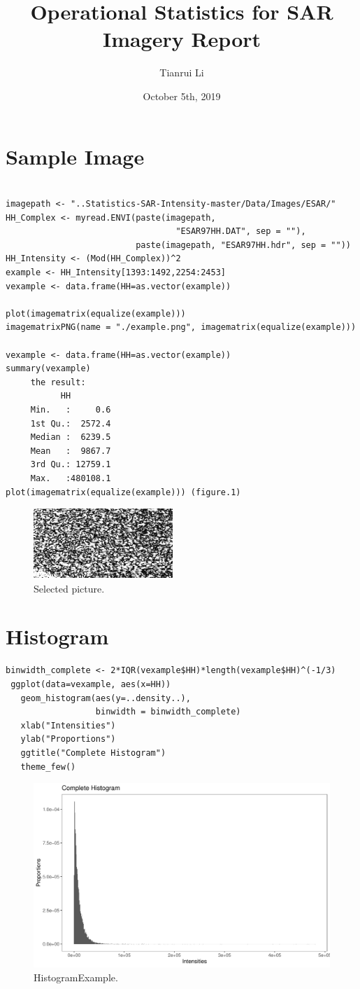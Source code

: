 \documentclass{article}
\title{Operational Statistics for SAR Imagery Report}
\author{Tianrui Li}
\date{October 5th, 2019}
\begin{document}
\maketitle
\section{Sample Image}
\begin{lstlisting}[frame=tb]

imagepath <- "..Statistics-SAR-Intensity-master/Data/Images/ESAR/"
HH_Complex <- myread.ENVI(paste(imagepath,
                                  "ESAR97HH.DAT", sep = ""), 
                          paste(imagepath, "ESAR97HH.hdr", sep = ""))
HH_Intensity <- (Mod(HH_Complex))^2
example <- HH_Intensity[1393:1492,2254:2453]
vexample <- data.frame(HH=as.vector(example))

plot(imagematrix(equalize(example)))
imagematrixPNG(name = "./example.png", imagematrix(equalize(example)))

vexample <- data.frame(HH=as.vector(example))
summary(vexample)
	 the result:
	       HH          
	 Min.   :     0.6  
	 1st Qu.:  2572.4  
	 Median :  6239.5  
	 Mean   :  9867.7  
	 3rd Qu.: 12759.1  
	 Max.   :480108.1  
plot(imagematrix(equalize(example))) (figure.1)
\end{lstlisting}

\begin{figure}[htb]
\centering	
\includegraphics[width=0.5\linewidth]{example.png}
\caption{Selected picture.}
\label{fig:example}
\end{figure}






\section{Histogram}
\begin{lstlisting}[frame=tb]
 binwidth_complete <- 2*IQR(vexample$HH)*length(vexample$HH)^(-1/3)
 ggplot(data=vexample, aes(x=HH)) 
   geom_histogram(aes(y=..density..), 
                  binwidth = binwidth_complete)  
   xlab("Intensities") 
   ylab("Proportions") 
   ggtitle("Complete Histogram") 
   theme_few()
\end{lstlisting}
\begin{figure}
	\centering
	\includegraphics[width=0.5\linewidth]{HistogramExample.pdf}
	\caption{HistogramExample.}
	\label{fig:HistogramExample}
\end{figure}
\end{document}
